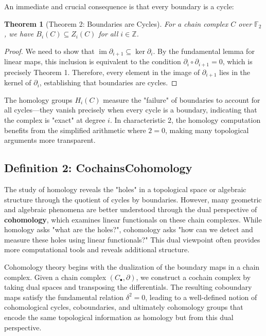 \documentclass[11pt]{article}
\theoremstyle{plain}
\newtheorem*{theorem}{Theorem}
\theoremstyle{definition}
\theoremstyle{remark}
\renewcommand{\ker}{\operatorname{ker}}
\begin{document}
An immediate and crucial consequence is that every boundary is a cycle:

\begin{theorem}[Theorem 2: Boundaries are Cycles]
For a chain complex $C$ over $\mathbb{F}_2$, we have $B_i(C) \subseteq Z_i(C)$ for all $i \in \mathbb{Z}$.
\end{theorem}

\begin{proof}
We need to show that $\operatorname{im} \partial_{i+1} \subseteq \ker \partial_i$. By the fundamental lemma for linear maps, this inclusion is equivalent to the condition $\partial_i \circ \partial_{i+1} = 0$, which is precisely Theorem 1. Therefore, every element in the image of $\partial_{i+1}$ lies in the kernel of $\partial_i$, establishing that boundaries are cycles.
\end{proof}

The homology groups $H_i(C)$ measure the "failure" of boundaries to account for all cycles—they vanish precisely when every cycle is a boundary, indicating that the complex is "exact" at degree $i$. In characteristic 2, the homology computation benefits from the simplified arithmetic where $2 = 0$, making many topological arguments more transparent.

\vspace{1em}

\subsection{Definition 2: CochainsCohomology}

The study of homology reveals the "holes" in a topological space or algebraic structure through the quotient of cycles by boundaries. However, many geometric and algebraic phenomena are better understood through the dual perspective of \textbf{cohomology}, which examines linear functionals on these chain complexes. While homology asks "what are the holes?", cohomology asks "how can we detect and measure these holes using linear functionals?" This dual viewpoint often provides more computational tools and reveals additional structure.

Cohomology theory begins with the dualization of the boundary maps in a chain complex. Given a chain complex $(C_\bullet, \partial)$, we construct a cochain complex by taking dual spaces and transposing the differentials. The resulting coboundary maps satisfy the fundamental relation $\delta^2 = 0$, leading to a well-defined notion of cohomological cycles, coboundaries, and ultimately cohomology groups that encode the same topological information as homology but from this dual perspective.
\end{document}
